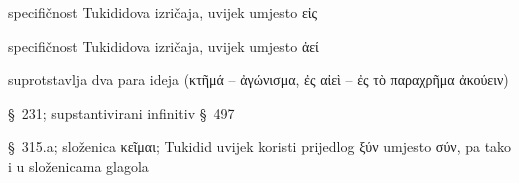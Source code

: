 \begin{description}[noitemsep]
\item[ἐς] specifičnost Tukididova izričaja, uvijek umjesto εἰς
\item[αἰεὶ] specifičnost Tukididova izričaja, uvijek umjesto ἀεί
\item[μᾶλλον ἢ] suprotstavlja dva para ideja \textgreek[variant=ancient]{(κτῆμά – ἀγώνισμα, ἐς αἰεὶ – ἐς τὸ παραχρῆμα ἀκούειν)}
\item[ἀκούειν] §~231; supstantivirani infinitiv §~497
\item[ξύγκειται] §~315.a; složenica κεῖμαι; Tukidid uvijek koristi prijedlog ξύν umjesto σύν, pa tako i u složenicama glagola

\end{description}



